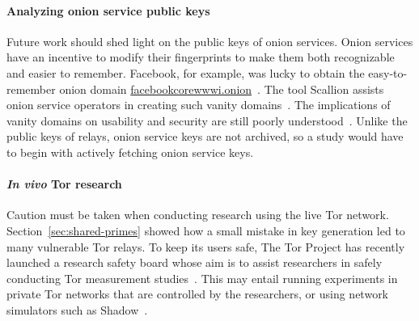 \paragraph{Analyzing onion service public keys}
Future work should shed light on the public keys of onion services.  Onion
services have an incentive to modify their fingerprints to make them both
recognizable and easier to remember.  Facebook, for example, was lucky to
obtain the easy-to-remember onion domain
\url{facebookcorewwwi.onion}~\cite{facebook}.  The tool Scallion assists onion
service operators in creating such vanity domains~\cite{scallion}.  The
implications of vanity domains on usability and security are still poorly
understood~\cite{vanity-domains}.  Unlike the public keys of relays, onion
service keys are not archived, so a study would have to begin with actively
fetching onion service keys.

\paragraph{\textit{In vivo} Tor research}
Caution must be taken when conducting research using the live Tor network.
Section~\ref{sec:shared-primes} showed how a small mistake in key generation led
to many vulnerable Tor relays.  To keep its users safe, The Tor Project has
recently launched a research safety board whose aim is to assist researchers in
safely conducting Tor measurement studies~\cite{safety-board}.  This may entail
running experiments in private Tor networks that are controlled by the
researchers, or using network simulators such as Shadow~\cite{stem}.
